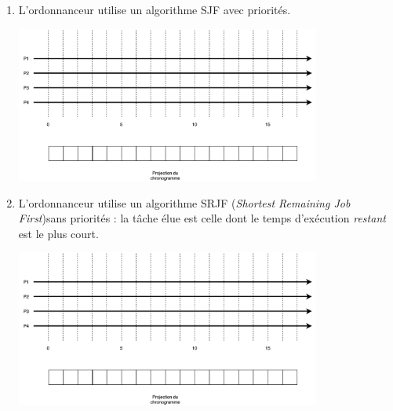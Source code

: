 \documentclass[a4paper,12pt,french]{article}
\begin{document}
\begin{enumerate}[\bfseries 1.]
    \item L'ordonnanceur utilise un algorithme SJF avec priorités.
            \begin{center}
            \includegraphics[width=10cm]{img/mc}\\
            \end{center}
        
     \item L'ordonnanceur utilise un algorithme SRJF (\textit{Shortest Remaining Job First})sans priorités : la tâche élue est celle dont le temps d'exécution \textit{restant} est le plus court.
                 \begin{center}
                 \includegraphics[width=10cm]{img/mc}\\
                 \end{center}
\end{enumerate}
\exo{}\\
\end{document}
